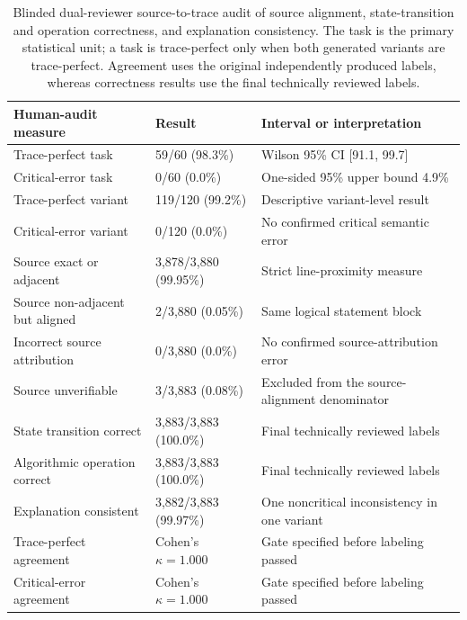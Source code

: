 \documentclass[letterpaper]{article}
\begin{document}
\begin{table}[t]
\centering
\small
\setlength{\tabcolsep}{5pt}
\begin{tabular}{@{}p{}p{}p{}@{}}
\toprule
Human-audit measure & Result & Interval or interpretation \\
\midrule
Trace-perfect task & 59/60 (98.3\%) & Wilson 95\% CI [91.1, 99.7] \\
Critical-error task & 0/60 (0.0\%) & One-sided 95\% upper bound 4.9\% \\
Trace-perfect variant & 119/120 (99.2\%) & Descriptive variant-level result \\
Critical-error variant & 0/120 (0.0\%) & No confirmed critical semantic error \\
Source exact or adjacent & 3,878/3,880 (99.95\%) & Strict line-proximity measure \\
Source non-adjacent but aligned & 2/3,880 (0.05\%) & Same logical statement block \\
Incorrect source attribution & 0/3,880 (0.0\%) & No confirmed source-attribution error \\
Source unverifiable & 3/3,883 (0.08\%) & Excluded from the source-alignment denominator \\
State transition correct & 3,883/3,883 (100.0\%) & Final technically reviewed labels \\
Algorithmic operation correct & 3,883/3,883 (100.0\%) & Final technically reviewed labels \\
Explanation consistent & 3,882/3,883 (99.97\%) & One noncritical inconsistency in one variant \\
Trace-perfect agreement & Cohen's $\kappa=1.000$ & Gate specified before labeling passed \\
Critical-error agreement & Cohen's $\kappa=1.000$ & Gate specified before labeling passed \\
\bottomrule
\end{tabular}
\caption{Blinded dual-reviewer source-to-trace audit of source alignment, state-transition and operation correctness, and explanation consistency. The task is the primary statistical unit; a task is trace-perfect only when both generated variants are trace-perfect. Agreement uses the original independently produced labels, whereas correctness results use the final technically reviewed labels.}
\label{tab:human-trace-audit}
\end{table}
\end{document}
